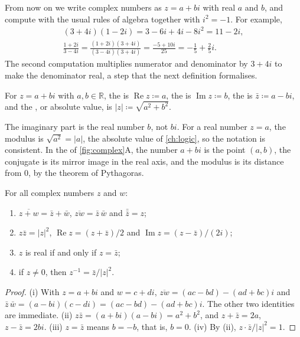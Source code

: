 From now on we write complex numbers as $z=a+bi$ with real $a$ and $b$, and compute with the usual rules of algebra together with $i^2=-1$. For example,
\begin{gather*}
(3+4i)(1-2i)=3-6i+4i-8i^2=11-2i,\\
\frac{1+2i}{3-4i}=\frac{(1+2i)(3+4i)}{(3-4i)(3+4i)}=\frac{-5+10i}{25}=-\frac15+\frac25i .
\end{gather*}
The second computation multiplies numerator and denominator by $3+4i$ to make the denominator real, a step that the next definition formalises.

\begin{definition}
\label{def:conjugate}
For $z=a+bi$ with $a,b\in\mathbb R$, the  is $\operatorname{Re}z\coloneqq a$, the  is $\operatorname{Im}z\coloneqq b$, the  is $\bar z\coloneqq a-bi$, and the , or absolute value, is $|z|\coloneqq\sqrt{a^2+b^2}$.
\end{definition}

The imaginary part is the real number $b$, not $bi$. For a real number $z=a$, the modulus is $\sqrt{a^2}=|a|$, the absolute value of \cref{ch:logic}, so the notation is consistent. In the  of \cref{fig:complex}A, the number $a+bi$ is the point $(a,b)$, the conjugate is its mirror image in the real axis, and the modulus is its distance from $0$, by the theorem of Pythagoras.

\begin{proposition}
\label{prop:conjugate}
For all complex numbers $z$ and $w$:
\begin{enumerate}
\item $\overline{z+w}=\bar z+\bar w$, $\overline{zw}=\bar z\,\bar w$ and $\bar{\bar z}=z$;
\item $z\bar z=|z|^2$, $\operatorname{Re}z=(z+\bar z)/2$ and $\operatorname{Im}z=(z-\bar z)/(2i)$;
\item $z$ is real if and only if $z=\bar z$;
\item if $z\ne0$, then $z^{-1}=\bar z/|z|^2$.
\end{enumerate}
\end{proposition}

\begin{proof}
(i) With $z=a+bi$ and $w=c+di$, $\overline{zw}=(ac-bd)-(ad+bc)i$ and $\bar z\,\bar w=(a-bi)(c-di)=(ac-bd)-(ad+bc)i$. The other two identities are immediate. (ii) $z\bar z=(a+bi)(a-bi)=a^2+b^2$, and $z+\bar z=2a$, $z-\bar z=2bi$. (iii) $z=\bar z$ means $b=-b$, that is, $b=0$. (iv) By (ii), $z\cdot\bar z/|z|^2=1$.
\end{proof}


